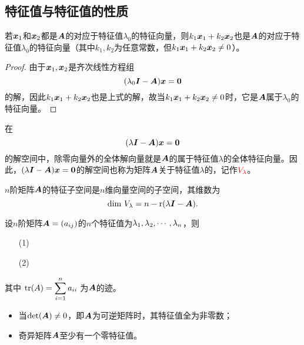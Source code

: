 \subsection{特征值与特征值的性质}

\begin{frame}  
  \begin{dingli}
    若${\boldsymbol{x}}_1$和${\boldsymbol{x}}_2$都是$\boldsymbol{A}$的对应于特征值$\lambda_0$的特征向量，则$k_1{\boldsymbol{x}}_1+k_2{\boldsymbol{x}}_2$也是$\boldsymbol{A}$的对应于特征值$\lambda_0$的特征向量（其中$k_1,k_2$为任意常数，但$k_1{\boldsymbol{x}}_1+k_2{\boldsymbol{x}}_2\ne 0$）。
  \end{dingli}  \vspace{.1in}\pause 
  \begin{proof}
    由于${\boldsymbol{x}}_1,{\boldsymbol{x}}_2$是齐次线性方程组
    $$
    (\lambda_0\MI-\MA)\vx=\M0
    $$
    的解，因此$k_1{\boldsymbol{x}}_1+k_2{\boldsymbol{x}}_2$也是上式的解，故当$k_1{\boldsymbol{x}}_1+k_2{\boldsymbol{x}}_2\ne 0$时，它是$\boldsymbol{A}$属于$\lambda_0$的特征向量。
  \end{proof}
\end{frame}

\begin{frame}
  在
  $$
  (\lambda\MI-\MA)\vx=\M0
  $$
  的解空间中，除零向量外的全体解向量就是$\boldsymbol{A}$的属于特征值$\lambda$的全体特征向量。因此，$(\lambda\MI-\MA)\vx=\M0$的解空间也称为矩阵$\boldsymbol{A}$关于特征值$\lambda$的，记作$\textcolor{red}{V_\lambda}$。 \vspace{.1in} \pause 

  $n$阶矩阵$\boldsymbol{A}$的特征子空间是$n$维向量空间的子空间，其维数为
  $$
  \mathrm{dim~} V_\lambda = n - \mathrm{r}(\lambda\boldsymbol{I}-\boldsymbol{A}).
  $$
\end{frame}

\begin{frame}
  
  \begin{dingli}
    设$n$阶矩阵$\boldsymbol{A}=(a_{ij})$的$n$个特征值为$\lambda_1,\lambda_2,\cdots,\lambda_n$，则
    \begin{itemize}
    \item[(1)] 
    \item[(2)]      
    \end{itemize}
    其中
    $\displaystyle
    \mathrm{tr}(A)=\sum_{i=1}^n a_{ii}
    $
    为$\boldsymbol{A}$的迹。
  \end{dingli}
  \vspace{.1in}\pause 

  \begin{itemize}
  \item 当$\mathrm{det}(\boldsymbol{A})\ne 0$，即$\boldsymbol{A}$为可逆矩阵时，其特征值全为非零数；
  \item 奇异矩阵$\boldsymbol{A}$至少有一个零特征值。      
  \end{itemize}  
\end{frame}

